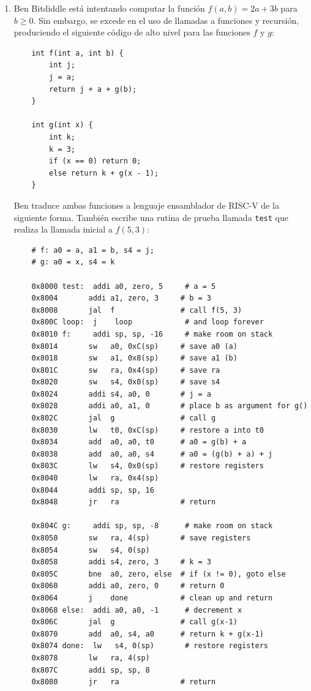 \documentclass[letterpaper,12pt]{article}
\begin{document}
\begin{enumerate}
    \vspace{0.5cm}

    \item Ben Bitdiddle está intentando computar la función $f(a, b) = 2a + 3b$ para $b \geq 0$. Sin embargo, se excede en el uso de llamadas a funciones y recursión, produciendo el siguiente código de alto nivel para las funciones $f$ y $g$:
    \begin{verbatim}
    int f(int a, int b) {
        int j;
        j = a;
        return j + a + g(b);
    }
    
    int g(int x) {
        int k;
        k = 3;
        if (x == 0) return 0;
        else return k + g(x - 1);
    }
    \end{verbatim}
    
    Ben traduce ambas funciones a lenguaje ensamblador de RISC-V de la siguiente forma. También escribe una rutina de prueba llamada \texttt{test} que realiza la llamada inicial a $f(5, 3)$:
    \begin{verbatim}
    # f: a0 = a, a1 = b, s4 = j;
    # g: a0 = x, s4 = k

    0x8000 test:  addi a0, zero, 5     # a = 5
    0x8004       addi a1, zero, 3     # b = 3
    0x8008       jal  f               # call f(5, 3)
    0x800C loop:  j    loop            # and loop forever
    0x8010 f:     addi sp, sp, -16     # make room on stack
    0x8014       sw   a0, 0xC(sp)     # save a0 (a)
    0x8018       sw   a1, 0x8(sp)     # save a1 (b)
    0x801C       sw   ra, 0x4(sp)     # save ra
    0x8020       sw   s4, 0x0(sp)     # save s4
    0x8024       addi s4, a0, 0       # j = a
    0x8028       addi a0, a1, 0       # place b as argument for g()
    0x802C       jal  g               # call g
    0x8030       lw   t0, 0xC(sp)     # restore a into t0
    0x8034       add  a0, a0, t0      # a0 = g(b) + a
    0x8038       add  a0, a0, s4      # a0 = (g(b) + a) + j
    0x803C       lw   s4, 0x0(sp)     # restore registers
    0x8040       lw   ra, 0x4(sp)
    0x8044       addi sp, sp, 16
    0x8048       jr   ra              # return

    0x804C g:     addi sp, sp, -8      # make room on stack
    0x8050       sw   ra, 4(sp)       # save registers
    0x8054       sw   s4, 0(sp)
    0x8058       addi s4, zero, 3     # k = 3
    0x805C       bne  a0, zero, else  # if (x != 0), goto else
    0x8060       addi a0, zero, 0     # return 0
    0x8064       j    done            # clean up and return
    0x8068 else:  addi a0, a0, -1      # decrement x
    0x806C       jal  g               # call g(x-1)
    0x8070       add  a0, s4, a0      # return k + g(x-1)
    0x8074 done:  lw   s4, 0(sp)       # restore registers
    0x8078       lw   ra, 4(sp)
    0x807C       addi sp, sp, 8
    0x8080       jr   ra              # return
    \end{verbatim}
    

\end{enumerate}
\end{document}
